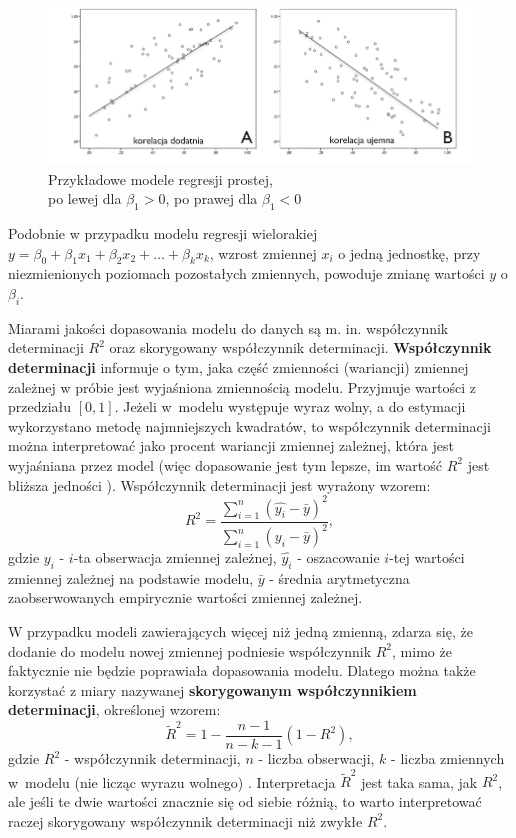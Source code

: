 \documentclass[12pt]{mwbk}
\theoremstyle{plain}
\theoremstyle{definition}
\theoremstyle{definition}
\newcommand\zrodlo[1]{\par\vspace{-3mm}{\small\textit{Źródło: }#1 }}
\begin{document}
\begin{figure}[!h]
	\centering
	\includegraphics[width=\linewidth]{rys/wykres-rozrzutu.png}
	\caption{Przykładowe modele regresji prostej, \\po lewej dla $\beta_1>0$, po prawej dla $\beta_1<0$}
	\label{fig:regresje}
	\zrodlo{\cite{wykres}}
\end{figure}
\noindent Podobnie w przypadku modelu regresji wielorakiej
$y=\beta_0+\beta_1 x_1+\beta_2 x_2 + \ldots + \beta_k x_k$, wzrost zmiennej $x_i$ o jedną jednostkę, przy niezmienionych poziomach pozostałych zmiennych, powoduje zmianę wartości $y$ o $\beta_i$.


Miarami jakości dopasowania modelu do danych są m. in. współczynnik determinacji $R^2$ oraz skorygowany współczynnik determinacji. \textbf{Współczynnik determinacji} informuje o tym, jaka część zmienności (wariancji) zmiennej zależnej w próbie jest wyjaśniona zmiennością modelu. Przyjmuje wartości z przedziału $[0,1]$. Jeżeli w~modelu występuje wyraz wolny, a do estymacji wykorzystano metodę najmniejszych kwadratów, to współczynnik determinacji można interpretować jako procent wariancji zmiennej zależnej, która jest wyjaśniana przez model (więc dopasowanie jest tym lepsze, im wartość $R^2$ jest bliższa jedności \cite{r2}). Współczynnik determinacji jest wyrażony wzorem:
$$R^2=\frac{\sum\limits_{i=1}^{n}(\hat{y_i}-\bar{y})^2}{\sum\limits_{i=1}^{n}(y_i-\bar{y})^2},$$ gdzie $y_i$ - $i$-ta obserwacja zmiennej zależnej, $\hat{y_i}$ - oszacowanie $i$-tej wartości zmiennej zależnej na podstawie modelu, $\bar{y}$ - średnia arytmetyczna zaobserwowanych empirycznie wartości zmiennej zależnej.

W przypadku modeli zawierających więcej niż jedną zmienną, zdarza się, że dodanie do modelu nowej zmiennej podniesie współczynnik $R^2$, mimo że faktycznie nie będzie poprawiała dopasowania modelu. Dlatego można także korzystać z miary nazywanej \textbf{skorygowanym współczynnikiem determinacji}, określonej wzorem:
$$\tilde{R}^2=1-\frac{n-1}{n-k-1}(1-R^2),$$
gdzie $R^2$ - współczynnik determinacji, $n$ - liczba obserwacji, $k$ - liczba zmiennych w~modelu (nie licząc wyrazu wolnego) \cite{skorygowany}. Interpretacja $\tilde{R}^2$ jest taka sama, jak $R^2$, ale jeśli te dwie wartości znacznie się od siebie różnią, to warto interpretować raczej skorygowany współczynnik determinacji niż zwykłe $R^2$.
\end{document}

